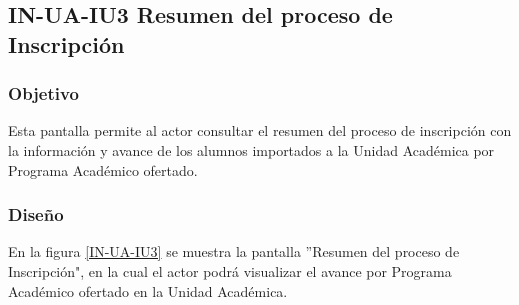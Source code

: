 \subsection{IN-UA-IU3 Resumen del proceso de Inscripción}

\subsubsection{Objetivo}
	
	Esta pantalla permite al actor consultar el resumen del proceso de inscripción con la información y avance de los alumnos importados a la Unidad Académica por Programa Académico ofertado.

\subsubsection{Diseño}

    En la figura \ref{IN-UA-IU3} se muestra la pantalla ''Resumen del proceso de Inscripción", en la cual el actor podrá visualizar el avance por Programa Académico ofertado en la Unidad Académica.
    
